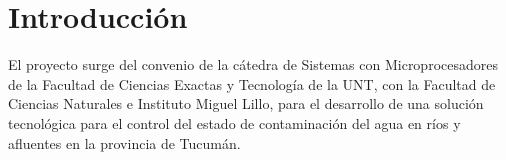 


\chapter{Introducción}
\label{chap:introduccion}

El proyecto surge del convenio de la cátedra de Sistemas con Microprocesadores de la Facultad de Ciencias Exactas y Tecnología de la UNT, con la Facultad de Ciencias Naturales e Instituto Miguel Lillo, para el desarrollo de una solución tecnológica para el control del estado de contaminación del agua en ríos y afluentes en la provincia de Tucumán.

